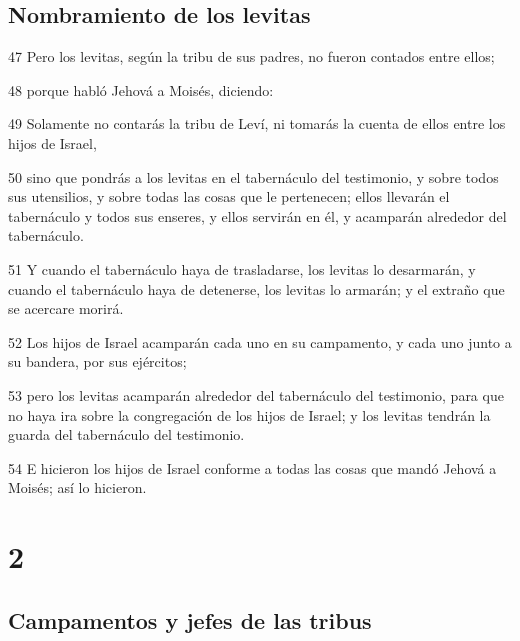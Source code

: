 \section*{Nombramiento de los levitas}

\par 47 Pero los levitas, según la tribu de sus padres, no fueron contados entre ellos;
\par 48 porque habló Jehová a Moisés, diciendo:
\par 49 Solamente no contarás la tribu de Leví, ni tomarás la cuenta de ellos entre los hijos de Israel,
\par 50 sino que pondrás a los levitas en el tabernáculo del testimonio, y sobre todos sus utensilios, y sobre todas las cosas que le pertenecen; ellos llevarán el tabernáculo y todos sus enseres, y ellos servirán en él, y acamparán alrededor del tabernáculo.
\par 51 Y cuando el tabernáculo haya de trasladarse, los levitas lo desarmarán, y cuando el tabernáculo haya de detenerse, los levitas lo armarán; y el extraño que se acercare morirá.
\par 52 Los hijos de Israel acamparán cada uno en su campamento, y cada uno junto a su bandera, por sus ejércitos;
\par 53 pero los levitas acamparán alrededor del tabernáculo del testimonio, para que no haya ira sobre la congregación de los hijos de Israel; y los levitas tendrán la guarda del tabernáculo del testimonio.
\par 54 E hicieron los hijos de Israel conforme a todas las cosas que mandó Jehová a Moisés; así lo hicieron.

\chapter{2}

\section*{Campamentos y jefes de las tribus}

